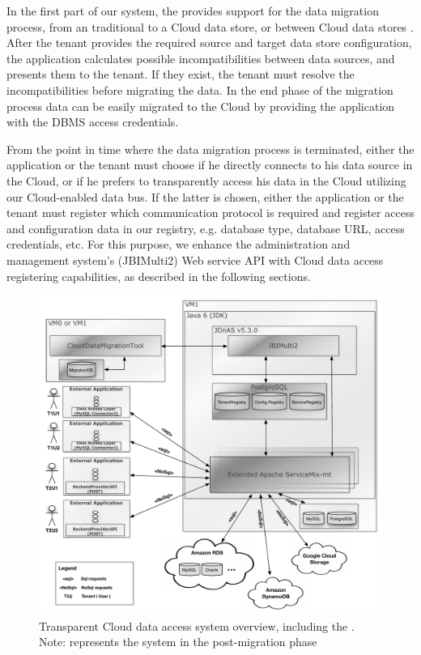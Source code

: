 In the first part of our system, the  provides support for the data migration process, from an traditional to a Cloud data store, or between Cloud data stores \cite{bachmann2012}. After the tenant provides the required source and target data store configuration, the application calculates possible incompatibilities between data sources, and presents them to the tenant. If they exist, the tenant must resolve the incompatibilities before migrating the data. In the end phase of the migration process data can be easily migrated to the Cloud by providing the application with the \ac{DBMS} access credentials. 

From the point in time where the data migration process is terminated, either the application or the tenant must choose if he directly connects to his data source in the Cloud, or if he prefers to transparently access his data in the Cloud utilizing our Cloud-enabled data bus. If the latter is chosen, either the application or the tenant must register which communication protocol is required and register access and configuration data in our registry, e.g. database type, database URL, access credentials, etc. For this purpose, we enhance the administration and management system's (JBIMulti2) Web service \ac{API} with Cloud data access registering capabilities, as described in the following sections. 

\begin{figure}[htb]
	\centering
		\includegraphics[clip, scale=0.5]{./gfx/systemoverview.pdf}
	\caption[Transparent Cloud Data Access System Overview]{Transparent Cloud data access system overview, including the  \cite{bachmann2012}. Note: represents the system in the post-migration phase}
	\label{fig:systemoverview}
\end{figure}

